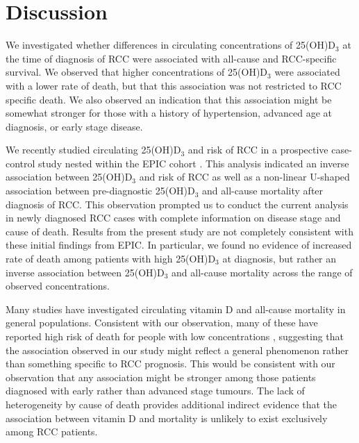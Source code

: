 \documentclass[a4paper,11pt]{article}
\begin{document}
\section*{Discussion}
We investigated whether differences in circulating concentrations of 
25(OH)D$_3$ at the time of diagnosis of RCC were associated with all-cause and 
RCC-specific survival. We observed that higher concentrations of 25(OH)D$_3$ 
were associated with a lower rate of death, but that this association was not 
restricted to RCC specific death. We also observed an indication that this 
association might be somewhat stronger for those with a 
history of hypertension, advanced age at diagnosis, or early stage disease.

We recently studied circulating 25(OH)D$_3$ and risk of RCC in a prospective
case-control study nested within the EPIC cohort \cite{muller_circulating_2014}.
This analysis indicated an inverse association between 
25(OH)D$_3$ and risk of RCC as well as a non-linear U-shaped association 
between pre-diagnostic 25(OH)D$_3$ and all-cause mortality after diagnosis 
of RCC. This observation prompted us to conduct the current analysis in newly 
diagnosed RCC cases with complete information on disease stage 
and cause of death. Results from the present study are not completely 
consistent with these initial findings from EPIC. In particular, we found no 
evidence of increased rate of death among patients with high 25(OH)D$_3$ at 
diagnosis, but rather an inverse association between 25(OH)D$_3$ and all-cause 
mortality across the range of observed concentrations.

Many studies have investigated circulating vitamin D and all-cause 
mortality in general populations. Consistent with our observation, many of these
have reported high risk of death for people with low concentrations 
\cite{schottker_strong_2013, virtanen_association_2011, hutchinson_low_2010, 
szulc_serum_2009, semba_low_2009, pilz_vitamin_2009, 
melamed_ml_25-hydroxyvitamin_2008, jia_nutritional_2007}, suggesting that 
the association observed in our study might reflect a general phenomenon rather 
than something specific to RCC prognosis. This would be consistent with our 
observation that any association might be stronger among those patients 
diagnosed with early rather than advanced stage tumours. The lack of 
heterogeneity by cause of death provides additional indirect evidence that the 
association between vitamin D and mortality is unlikely to exist exclusively 
among RCC patients. 
\end{document}
